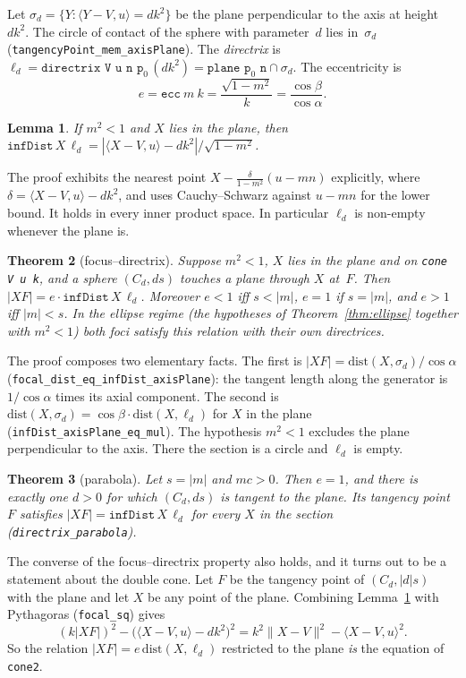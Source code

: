 \documentclass[11pt]{article}
\newtheorem{theorem}{Theorem}
\newtheorem{lemma}[theorem]{Lemma}
\theoremstyle{remark}
\newcommand{\lean}[1]{\texttt{#1}}
\newcommand{\ip}[2]{\langle #1,#2\rangle}
\newcommand{\nm}[1]{\lVert #1\rVert}
\begin{document}
Let $\sigma_d=\{Y:\ip{Y-V}u=dk^2\}$ be the plane perpendicular to the axis at height~$dk^2$.
The circle of contact of the sphere with parameter~$d$ lies in~$\sigma_d$
(\lean{tangencyPoint\_mem\_axisPlane}). The \emph{directrix} is
$\ell_d=\lean{directrix V u n p}_0\,(dk^2)=\lean{plane p}_0\lean{ n}\cap\sigma_d$. The eccentricity is
\[
e=\lean{ecc}\ m\ k=\frac{\sqrt{1-m^2}}{k}=\frac{\cos\beta}{\cos\alpha}.
\]

\begin{lemma}\label{lem:infdist}
If $m^2<1$ and $X$ lies in the plane, then
$\lean{infDist}\,X\,\ell_d=|\ip{X-V}u-dk^2|/\sqrt{1-m^2}$.
\end{lemma}

The proof exhibits the nearest point $X-\frac{\delta}{1-m^2}(u-mn)$ explicitly, where
$\delta=\ip{X-V}u-dk^2$, and uses Cauchy--Schwarz against $u-mn$ for the lower bound. It holds
in every inner product space. In particular $\ell_d$ is non-empty whenever the plane is.

\begin{theorem}[focus--directrix]\label{thm:directrix}
Suppose $m^2<1$, $X$ lies in the plane and on \lean{cone V u k}, and a sphere $(C_d,ds)$ touches a
plane through $X$ at~$F$. Then $|XF|=e\cdot\lean{infDist}\,X\,\ell_d$. Moreover $e<1$ iff $s<|m|$,
$e=1$ if $s=|m|$, and $e>1$ iff $|m|<s$. In the ellipse regime (the hypotheses of
Theorem~\ref{thm:ellipse} together with $m^2<1$) both foci satisfy this relation with their own
directrices.
\end{theorem}

The proof composes two elementary facts. The first is $|XF|=\mathrm{dist}(X,\sigma_d)/\cos\alpha$
(\lean{focal\_dist\_eq\_infDist\_axisPlane}): the tangent length along the generator is $1/\cos\alpha$
times its axial component. The second is
$\mathrm{dist}(X,\sigma_d)=\cos\beta\cdot\mathrm{dist}(X,\ell_d)$ for $X$ in the plane
(\lean{infDist\_axisPlane\_eq\_mul}). The hypothesis $m^2<1$ excludes the plane perpendicular to
the axis. There the section is a circle and $\ell_d$ is empty.

\begin{theorem}[parabola]\label{thm:parabola}
Let $s=|m|$ and $mc>0$. Then $e=1$, and there is exactly one $d>0$ for which $(C_d,ds)$ is tangent to the plane.
Its tangency point~$F$ satisfies $|XF|=\lean{infDist}\,X\,\ell_d$ for every $X$ in the section
(\lean{directrix\_parabola}).
\end{theorem}

The converse of the focus--directrix property also holds, and it turns out to be a statement
about the double cone. Let $F$ be the tangency point of $(C_d,|d|s)$ with the plane and let $X$ be
any point of the plane. Combining Lemma~\ref{lem:infdist} with Pythagoras (\lean{focal\_sq}) gives
\[
(k|XF|)^2-\bigl(\ip{X-V}u-dk^2\bigr)^2=k^2\nm{X-V}^2-\ip{X-V}u^2 .
\]
So the relation $|XF|=e\,\mathrm{dist}(X,\ell_d)$ restricted to the plane \emph{is} the equation
of \lean{cone2}.
\end{document}
